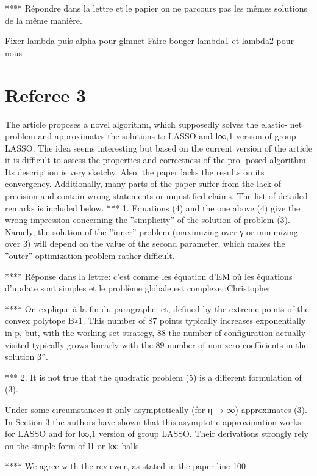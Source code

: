 \documentclass[a4paper,11pt]{texMemo}
\begin{document}
**** Répondre dans la lettre et le papier on ne parcours pas les mêmes solutions de la même manière.

Fixer lambda puis alpha pour glmnet
Faire bouger lambda1 et lambda2 pour nous



\section*{Referee 3}




The article proposes a novel algorithm, which supposedly solves the elastic- net 
problem and approximates the solutions to LASSO and l∞,1 version of group LASSO. 
The idea seems interesting but based on the current version of the article it is 
difficult to assess the properties and correctness of the pro- posed algorithm.
 Its description is very sketchy. Also, the paper lacks the results on its convergency.
 Additionally, many parts of the paper suffer from the lack of precision and contain wrong statements or unjustified claims. 
The list of detailed remarks is included below.
*** 1. Equations (4) and the one above (4) give the wrong impression concerning the ”simplicity” of the solution of problem (3).
Namely, the solution of the ”inner” problem (maximizing over γ or minimizing over β) 
will depend on the value of the second parameter, 
which makes the ”outer” optimization problem rather difficult.

**** Réponse dans la lettre: c'est comme les équation d'EM où les équations d'update sont simples et le problème globale est 
complexe :Christophe: 

**** On explique à la fin du paragraphe:
et, defined by the extreme points of the convex polytope B∗1. This number of
87 points typically increases exponentially in p, but, with the working-set strategy,
88 the number of configuration actually visited typically grows linearly with the
89 number of non-zero coefficients in the solution βˆ.



*** 2. It is not true that the quadratic problem (5) is a different formulation of (3). 

Under some circumstances it only asymptotically (for η → ∞) approximates (3).
 In Section 3 the authors have shown that this asymptotic approximation works for LASSO 
and for l∞,1 version of group LASSO. Their derivations strongly rely on the simple form of l1 or l∞ balls. 

**** We agree with the reviewer, as stated in the paper line 100
\end{document}

